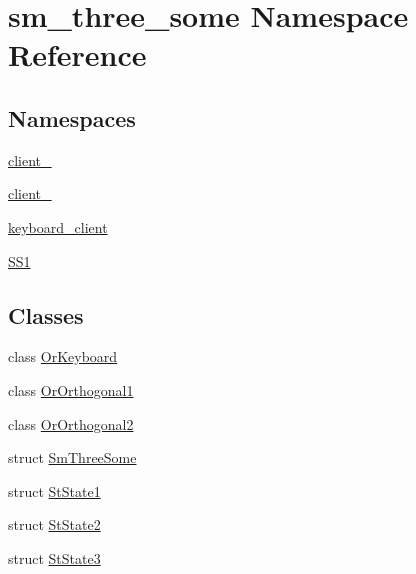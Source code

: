 \hypertarget{namespacesm__three__some}{}\section{sm\+\_\+three\+\_\+some Namespace Reference}
\label{namespacesm__three__some}
\subsection*{Namespaces}
\begin{DoxyCompactItemize}
\item 
 \hyperlink{namespacesm__three__some_1_1client__1}{client\+\_}
\item 
 \hyperlink{namespacesm__three__some_1_1client__2}{client\+\_}
\item 
 \hyperlink{namespacesm__three__some_1_1keyboard__client}{keyboard\+\_\+client}
\item 
 \hyperlink{namespacesm__three__some_1_1SS1}{S\+S1}
\end{DoxyCompactItemize}
\subsection*{Classes}
\begin{DoxyCompactItemize}
\item 
class \hyperlink{classsm__three__some_1_1OrKeyboard}{Or\+Keyboard}
\item 
class \hyperlink{classsm__three__some_1_1OrOrthogonal1}{Or\+Orthogonal1}
\item 
class \hyperlink{classsm__three__some_1_1OrOrthogonal2}{Or\+Orthogonal2}
\item 
struct \hyperlink{structsm__three__some_1_1SmThreeSome}{Sm\+Three\+Some}
\item 
struct \hyperlink{structsm__three__some_1_1StState1}{St\+State1}
\item 
struct \hyperlink{structsm__three__some_1_1StState2}{St\+State2}
\item 
struct \hyperlink{structsm__three__some_1_1StState3}{St\+State3}
\end{DoxyCompactItemize}

